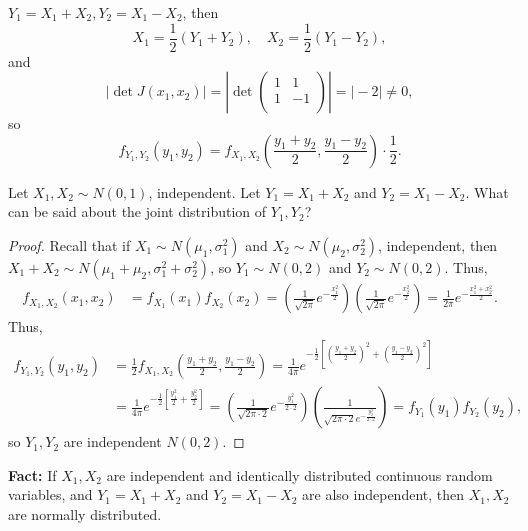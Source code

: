\begin{eg}
    \(Y_1 = X_1 + X_2, Y_2 = X_1 - X_2\), then 
    \[
        X_1 = \frac{1}{2} \left( Y_1 + Y_2 \right), \quad X_2 = \frac{1}{2} \left( Y_1 - Y_2 \right),  
    \] 
    and 
    \[
        \left\vert \det J(x_1, x_2) \right\vert  = \left\vert \det \begin{pmatrix}
            1 & 1  \\
            1 & -1  \\
        \end{pmatrix} \right\vert = \vert -2 \vert  \neq 0, 
    \]
    so 
    \[
        f_{Y_1, Y_2} (y_1, y_2) = f_{X_1, X_2} \left( \frac{y_1 + y_2}{2}, \frac{y_1 - y_2}{2} \right) \cdot \frac{1}{2}. 
    \]
\end{eg}

\begin{eg}
    Let \(X_1, X_2 \sim N(0, 1)\), independent. Let \(Y_1 = X_1 + X_2\) and \(Y_2 = X_1 - X_2\). What can be said about the joint distribution of \(Y_1, Y_2\)?    
\end{eg}
\begin{proof}
    Recall that if \(X_1 \sim N(\mu _1, \sigma _1^2)\) and \(X_2 \sim N(\mu _2, \sigma _2^2)\), independent, then \(X_1 + X_2 \sim N(\mu _1 + \mu _2, \sigma _1^2 + \sigma _2^2)\), so \(Y_1 \sim N(0, 2)\) and \(Y_2 \sim N(0, 2)\). Thus, 
    \begin{align*}
        f_{X_1, X_2} (x_1, x_2) &= f_{X_1}(x_1) f_{X_2}(x_2) = \left( \frac{1}{\sqrt{2\pi } } e^{- \frac{x_1^2}{2}} \right) \left( \frac{1}{\sqrt{2 \pi} } e^{- \frac{x_2^2}{2}} \right) = \frac{1}{2 \pi } e^{- \frac{x_1^2 + x_2^2}{2}}.  
    \end{align*}     
    Thus, 
    \begin{align*}
        f_{Y_1, Y_2} (y_1, y_2) &= \frac{1}{2} f_{X_1, X_2} \left( \frac{y_1 + y_2}{2}, \frac{y_1 - y_2}{2} \right) = \frac{1}{4 \pi} e^{-\frac{1}{2} \left[ \left( \frac{y_1 + y_2}{2} \right)^2 + \left( \frac{y_1 - y_2}{2} \right)^2   \right] } \\
        &= \frac{1}{4 \pi} e^{-\frac{1}{2} \left[ \frac{y_1^2}{2} + \frac{y_2^2}{2} \right] } = \left( \frac{1}{\sqrt{2\pi \cdot 2} } e^{- \frac{y_1^2}{2 \cdot 2}} \right) \left( \frac{1}{\sqrt{2\pi \cdot 2} e^{-\frac{y_2^2}{2 \cdot 2}}} \right) = f_{Y_1}(y_1) f_{Y_2}(y_2),   
    \end{align*}
    so \(Y_1, Y_2\) are independent \(N(0, 2)\).  
\end{proof}

\textbf{Fact:} If \(X_1, X_2\) are independent and identically distributed continuous random variables, and \(Y_1 = X_1 + X_2\) and \(Y_2 = X_1 - X_2\) are also independent, then \(X_1, X_2\) are normally distributed. 

